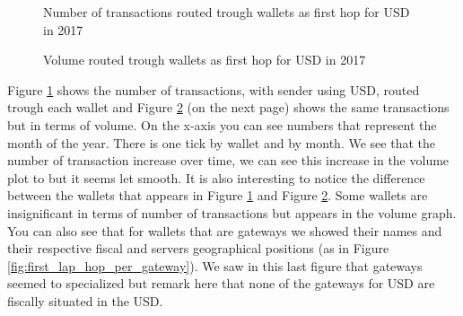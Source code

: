 \begin{figure}[h!]
  \caption{Number of transactions routed trough wallets as first hop for USD in 2017}
  \label{fig:first_hop_USD_nb_txns}
\end{figure}

\begin{figure}[h!]
  \caption{Volume routed trough wallets as first hop for USD in 2017}
  \label{fig:first_hop_USD_volume}
\end{figure}

Figure \ref{fig:first_hop_USD_nb_txns} shows the number of transactions, with sender using USD, routed trough each wallet and Figure \ref{fig:first_hop_USD_volume}  (on the next page) shows the same transactions but in terms of volume. On the x-axis you can see numbers that represent the month of the year. There is one tick by wallet and by month. We see that the number of transaction increase over time, we can see this increase in the volume plot to but it seems let smooth. It is also interesting to notice the difference between the wallets that appears in Figure \ref{fig:first_hop_USD_nb_txns} and Figure \ref{fig:first_hop_USD_volume}. Some wallets are insignificant in terms of number of transactions but appears in the volume graph. You can also see that for wallets that are gateways we showed their names and their respective fiscal and servers geographical positions (as in Figure \ref{fig:first_lap_hop_per_gateway}). We saw in this last figure that gateways seemed to specialized but remark here that none of the gateways for USD are fiscally situated in the USD. 
\vspace{\baselineskip}


